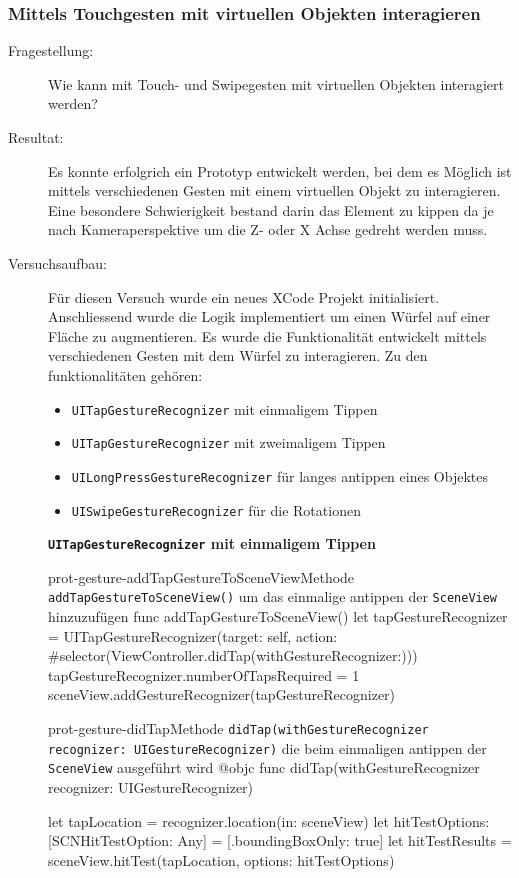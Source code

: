 \subsubsection{Mittels Touchgesten mit virtuellen Objekten interagieren}
\begin{description}
	\item[Fragestellung:] Wie kann mit Touch- und Swipegesten mit virtuellen Objekten interagiert werden?
	\item[Resultat:] Es konnte erfolgrich ein Prototyp entwickelt werden, bei dem es Möglich ist mittels verschiedenen Gesten mit einem virtuellen Objekt zu interagieren. Eine besondere Schwierigkeit bestand darin das Element zu kippen da je nach Kameraperspektive um die Z- oder X Achse gedreht werden muss. 
    \item[Versuchsaufbau:] Für diesen Versuch wurde ein neues XCode Projekt initialisiert. Anschliessend wurde die Logik implementiert um einen Würfel auf einer Fläche zu augmentieren. Es wurde die Funktionalität entwickelt mittels verschiedenen Gesten mit dem Würfel zu interagieren. Zu den funktionalitäten gehören:
    
    
    \begin{itemize}
        \item \texttt{UITapGestureRecognizer} mit einmaligem Tippen
        \item \texttt{UITapGestureRecognizer} mit zweimaligem Tippen
        \item \texttt{UILongPressGestureRecognizer} für langes antippen eines Objektes
        \item \texttt{UISwipeGestureRecognizer} für die Rotationen
    \end{itemize}


    \textbf{\texttt{UITapGestureRecognizer} mit einmaligem Tippen}\\

    \begin{code}{prot-gesture-addTapGestureToSceneView}{Methode \texttt{addTapGestureToSceneView()} um das einmalige antippen der \texttt{SceneView} hinzuzufügen}
    func addTapGestureToSceneView() {
        let tapGestureRecognizer = UITapGestureRecognizer(target: self, action: #selector(ViewController.didTap(withGestureRecognizer:)))
        tapGestureRecognizer.numberOfTapsRequired = 1
        sceneView.addGestureRecognizer(tapGestureRecognizer)
    }
    \end{code}

    \begin{code}{prot-gesture-didTap}{Methode \texttt{didTap(withGestureRecognizer recognizer: UIGestureRecognizer)} die beim einmaligen antippen der \texttt{SceneView} ausgeführt wird}
    @objc
    func didTap(withGestureRecognizer recognizer: UIGestureRecognizer) {
        let tapLocation = recognizer.location(in: sceneView)
        let hitTestOptions: [SCNHitTestOption: Any] = [.boundingBoxOnly: true]
        let hitTestResults = sceneView.hitTest(tapLocation, options: hitTestOptions)

}
\end{code}
\end{description}
